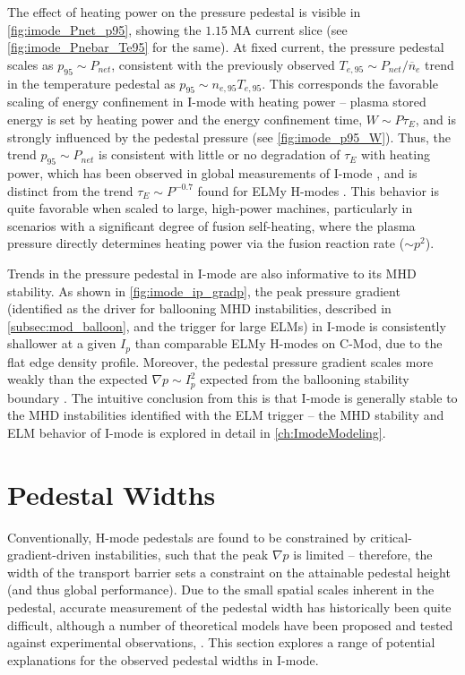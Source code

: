 The effect of heating power on the pressure pedestal is visible in \cref{fig:imode_Pnet_p95}, showing the $\SI{1.15}{\mega\ampere}$ current slice (see \cref{fig:imode_Pnebar_Te95} for the same).  At fixed current, the pressure pedestal scales as $p_{95} \sim P_{net}$, consistent with the previously observed $T_{e,95} \sim P_{net}/\overline{n}_e$ trend in the temperature pedestal as $p_{95} \sim n_{e,95} T_{e,95}$.  This corresponds the favorable scaling of energy confinement in I-mode with heating power -- plasma stored energy is set by heating power and the energy confinement time, $W \sim P \tau_E$, and is strongly influenced by the pedestal pressure (see \cref{fig:imode_p95_W}).  Thus, the trend $p_{95} \sim P_{net}$ is consistent with little or no degradation of $\tau_E$ with heating power, which has been observed in global measurements of I-mode \cite{Dominguez2012,Whyte2010}, and is distinct from the trend $\tau_E \sim P^{-0.7}$ found for ELMy H-modes \cite{ITER1999}.  This behavior is quite favorable when scaled to large, high-power machines, particularly in scenarios with a significant degree of fusion self-heating, where the plasma pressure directly determines heating power via the fusion reaction rate ($\sim p^2$).

Trends in the pressure pedestal in I-mode are also informative to its MHD stability.  As shown in \cref{fig:imode_ip_gradp}, the peak pressure gradient (identified as the driver for ballooning MHD instabilities, described in \cref{subsec:mod_balloon}, and the trigger for large ELMs) in I-mode is consistently shallower at a given $I_p$ than comparable ELMy H-modes on C-Mod, due to the flat edge density profile.  Moreover, the pedestal pressure gradient scales more weakly than the expected $\nabla p \sim I_p^2$ expected from the ballooning stability boundary \cite{Connor1978}.  The intuitive conclusion from this is that I-mode is generally stable to the MHD instabilities identified with the ELM trigger -- the MHD stability and ELM behavior of I-mode is explored in detail in \cref{ch:ImodeModeling}.\nicesectionending

\section{Pedestal Widths}\label{sec:imode_width}

Conventionally, H-mode pedestals are found to be constrained by critical-gradient-driven instabilities, such that the peak $\nabla p$ is limited -- therefore, the width of the transport barrier sets a constraint on the attainable pedestal height (and thus global performance).  Due to the small spatial scales inherent in the pedestal, accurate measurement of the pedestal width has historically been quite difficult, although a number of theoretical models have been proposed and tested against experimental observations, \eg \cite{Maggi2010,Beurskens2011,Onjun2002}.  This section explores a range of potential explanations for the observed pedestal widths in I-mode.

